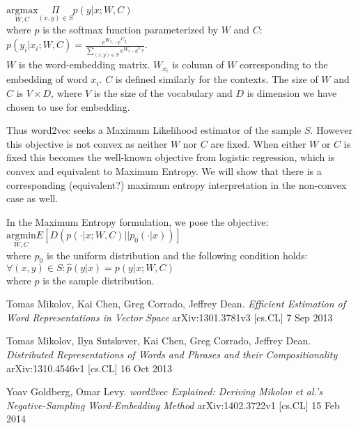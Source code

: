 \documentclass[]{article}
\begin{document}
$\underset{W,C}{\text{argmax}} \underset{(x,y) \in S}{\Pi}{p(y|x; W, C)}$\\

\noindent where $p$ is the softmax function parameterized by $W$ and $C$:\\

$p(y_i|x_i; W,C) = \frac{e^{W_{x_i}} \cdot e^{C_{y_i}}}{\sum_{(x,y) \in S}e^{W_x} \cdot e^{C_y}}$.\\

$W$ is the word-embedding matrix. $W_{x_i}$ is column of $W$ corresponding to the embedding of word $x_i$. $C$ is defined similarly for the contexts. The size of $W$ and $C$ is $V \times D$, where $V$ is the size of the vocabulary and $D$ is dimension we have chosen to use for embedding.

Thus word2vec seeks a Maximum Likelihood estimator of the sample $S$. However this objective is not convex as neither $W$ nor $C$ are fixed. When either $W$ or $C$ is fixed this becomes the well-known objective from logistic regression, which is convex and equivalent to Maximum Entropy\cite{dummy}. We will show that there is a corresponding (equivalent?) maximum entropy interpretation in the non-convex case as well.

In the Maximum Entropy formulation, we pose the objective:\\

$\underset{W,C}{\text{argmin}} E \left[D(p(\cdot|x; W, C) \vert \vert  p_0(\cdot|x))\right]$\\

\noindent where $p_0$ is the uniform distribution and the following condition holds:\\

$\forall (x,y) \in S: \hat{p}(y|x) = p(y|x; W,C)$\\

\noindent where $\hat{p}$ is the sample distribution. 


\begin{thebibliography}{1}
 Tomas Mikolov, Kai Chen, Greg Corrado, Jeffrey Dean. {\em Efficient Estimation of Word Representations in Vector Space} arXiv:1301.3781v3 [cs.CL] 7 Sep 2013

 Tomas Mikolov, Ilya Sutskever, Kai Chen, Greg Corrado, Jeffrey Dean. {\em Distributed Representations of Words and Phrases and their Compositionality} arXiv:1310.4546v1  [cs.CL]  16 Oct 2013

 Yoav Goldberg, Omar Levy. {\em word2vec Explained: Deriving Mikolov et al.'s Negative-Sampling Word-Embedding Method} arXiv:1402.3722v1  [cs.CL]  15 Feb 2014

\end{thebibliography}
\end{document}
